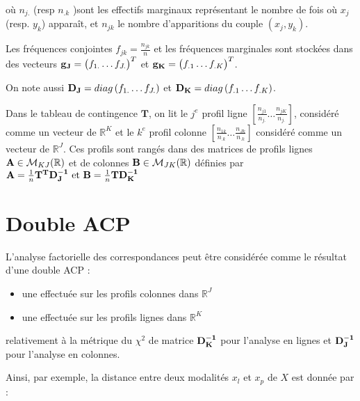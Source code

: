 \documentclass[letterpaper,10pt,french]{sphinxmanual}
\begin{document}
\sphinxAtStartPar
où \(n_{j.}\) (resp \(n_{.k}\) )sont les effectifs marginaux représentant le nombre de fois où \(x_j\) (resp. \(y_k\)) apparaît, et \(n_{jk}\) le nombre d’apparitions du couple \((x_j,y_k)\).

\sphinxAtStartPar
Les fréquences conjointes \(f_{jk}=\frac{n_{jk}}{n}\) et les fréquences marginales sont stockées dans des vecteurs \({\bf g_J}=\begin{pmatrix}f_{1.}\ldots f_{J.} \end{pmatrix}^T\) et \({\bf g_K}=\begin{pmatrix}f_{.1}\ldots f_{.K} \end{pmatrix}^T\).

\sphinxAtStartPar
On note aussi \({\bf D_J}=diag\left (f_{1.}\ldots f_{J.}\right )\) et \({\bf D_K}=diag\left (f_{.1}\ldots f_{.K} \right )\).

\sphinxAtStartPar
Dans le tableau de contingence \(\mathbf T\), on lit le \(j^e\) profil ligne \([\frac{n_{j1}}{n_{j.}}\ldots \frac{n_{jK}}{n_{j.}}]\), considéré comme un vecteur de \(\mathbb{R}^K\) et le \(k^e\) profil colonne \([\frac{n_{1k}}{n_{.k}}\ldots \frac{n_{Jk}}{n_{.k}}]\) considéré comme un vecteur de \(\mathbb{R}^J\). Ces profils sont rangés dans des matrices de profils lignes \({\bf A}\in\mathcal{M}_{KJ}(\mathbb{R})\) et de colonnes \({\bf B}\in\mathcal{M}_{JK}(\mathbb{R})\) définies par \({\bf A}=\frac{1}{n}{\bf T^TD_J^{-1}}\textrm{  et  } {\bf B}=\frac{1}{n}{\bf T D_K^{-1}}\)


\section{Double ACP}
\label{\detokenize{afc:double-acp}}
\sphinxAtStartPar
L’analyse factorielle des correspondances peut être considérée comme le résultat d’une double ACP :
\begin{itemize}
\item {} 
\sphinxAtStartPar
une effectuée sur les profils colonnes dans \(\mathbb{R}^J\)

\item {} 
\sphinxAtStartPar
une effectuée sur les profils lignes dans \(\mathbb{R}^K\)

\end{itemize}

\sphinxAtStartPar
relativement à la métrique du \(\chi^2\) de matrice \({\bf D_K^{-1}}\) pour l’analyse en lignes et \({\bf D_J^{-1}}\) pour l’analyse en colonnes.

\sphinxAtStartPar
Ainsi, par exemple, la distance entre deux modalités \(x_l\) et \(x_p\) de \(X\) est donnée par :
\end{document}
